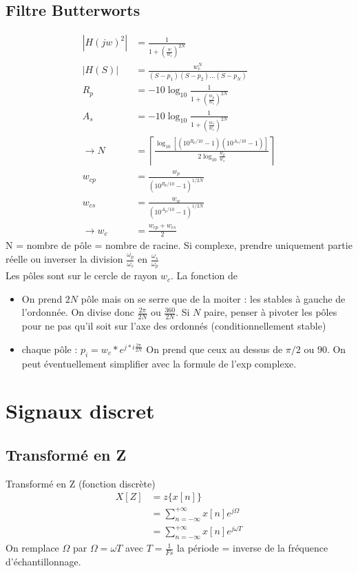 \documentclass{article}
\theoremstyle{plain}%
\theoremstyle{definition}
\theoremstyle{remark}
\begin{document}
\subsection{Filtre Butterworts}
\begin{align*}
    \left| H(jw)^2 \right| &= \frac{1}{1+ (\frac{w}{w_c})^{2N}} \\
    \left| H(S) \right| &= \frac{w_c^N}{(S-p_1)(S-p_2)\dots(S-p_N)}\\
    R_p &= -10 \log_{10} \frac{1}{1 + (\frac{w_p}{w_c})^{2N}} \\
    A_s &= -10 \log_{10} \frac{1}{1 + (\frac{w_s}{w_c})^{2N}} \\
    \rightarrow N &= \left\lceil \frac{\log_{10} [(10^{R_p/10} - 1)(10^{A_s/10} - 1)]}{2 \log_{10} \frac{w_p}{w_s}}\right\rceil \\
    w_{cp} &= \frac{w_p}{(10^{R_p/10} - 1)^{1/2N}} \\
    w_{cs} &= \frac{w_w}{(10^{A_p/10} - 1)^{1/2N}} \\
    \rightarrow w_c &= \frac{w_{cp} + w_{cs}}{2}
\end{align*}
N = nombre de pôle = nombre de racine. Si complexe, prendre uniquement partie réelle ou inverser la division $ \frac{\omega _p}{\omega _s} $ en $ \frac{\omega _s}{\omega _p} $ \\
Les pôles sont sur le cercle de rayon $ w_c $. La fonction de 
\begin{itemize}
    \item On prend $ 2N $ pôle mais on se serre que de la moiter : les stables à gauche de l'ordonnée. On divise donc $ \frac{2 \pi }{2N} $ ou $ \frac{360}{2N} $. Si $ N $ paire, penser à pivoter les pôles pour ne pas qu'il soit sur l'axe des ordonnés (conditionnellement stable)
    \item chaque pôle : $ p_i = w_c * e^{j * i \frac{2 \pi}{2N}} $ On prend que ceux au dessus de $ \pi /2 $ ou $ 90 $. On peut éventuellement simplifier avec la formule de l'exp complexe.
\end{itemize}


\section{Signaux discret}
\subsection{Transformé en Z}
Transformé en Z (fonction discrète) \begin{align*}
    X[Z] &= z\{x[n]\} \\ 
        &= \sum_{n=-\infty }^{+\infty }x[n]e^{j \Omega } \\
        &= \sum_{n=-\infty }^{+\infty }x[n]e^{j \omega T }
\end{align*}
On remplace $ \Omega  $ par $ \Omega = \omega T $ avec $ T = \frac{1}{Fs}$ la période = inverse de la fréquence d'échantillonnage.
\end{document}
